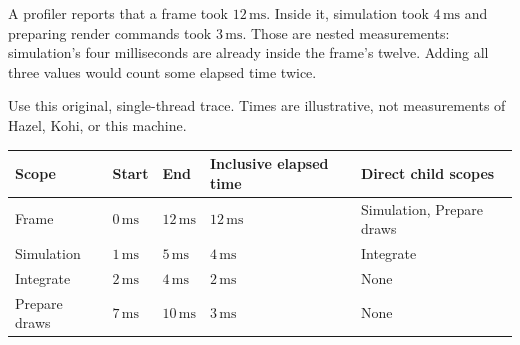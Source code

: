 \hypertarget{06-engine-ii-ch041-read-a-timing-tree-without-counting-the-same-work-twice}{}

A profiler reports that a frame took \(12\,\mathrm{ms}\). Inside it, simulation took \(4\,\mathrm{ms}\) and preparing render commands took \(3\,\mathrm{ms}\). Those are nested measurements: simulation's four milliseconds are already inside the frame's twelve. Adding all three values would count some elapsed time twice.

Use this original, single-thread trace. Times are illustrative, not measurements of Hazel, Kohi, or this machine.

{\def\LTcaptype{none} %
\begin{longtable}[]{@{}
  >{\raggedright\arraybackslash}p{}
  >{\raggedleft\arraybackslash}p{}
  >{\raggedleft\arraybackslash}p{}
  >{\raggedleft\arraybackslash}p{}
  >{\raggedright\arraybackslash}p{}@{}}
\toprule\noalign{}
\begin{minipage}[b]{\linewidth}\raggedright
Scope
\end{minipage} & \begin{minipage}[b]{\linewidth}\raggedleft
Start
\end{minipage} & \begin{minipage}[b]{\linewidth}\raggedleft
End
\end{minipage} & \begin{minipage}[b]{\linewidth}\raggedleft
Inclusive elapsed time
\end{minipage} & \begin{minipage}[b]{\linewidth}\raggedright
Direct child scopes
\end{minipage} \\
\midrule\noalign{}
\endhead
\bottomrule\noalign{}
\endlastfoot
Frame & \(0\,\mathrm{ms}\) & \(12\,\mathrm{ms}\) & \(12\,\mathrm{ms}\) & Simulation, Prepare draws \\
Simulation & \(1\,\mathrm{ms}\) & \(5\,\mathrm{ms}\) & \(4\,\mathrm{ms}\) & Integrate \\
Integrate & \(2\,\mathrm{ms}\) & \(4\,\mathrm{ms}\) & \(2\,\mathrm{ms}\) & None \\
Prepare draws & \(7\,\mathrm{ms}\) & \(10\,\mathrm{ms}\) & \(3\,\mathrm{ms}\) & None \\
\end{longtable}
}

